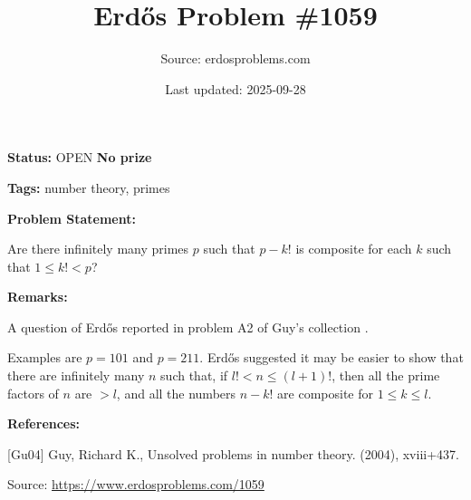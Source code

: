 \documentclass{article}
\title{Erd\H{o}s Problem \#1059}
\date{Last updated: 2025-09-28}
\author{Source: erdosproblems.com}
\begin{document}
\maketitle

\noindent\textbf{Status:} OPEN \quad \textbf{No prize}

\noindent\textbf{Tags:} number theory, primes

\medskip
\noindent\textbf{Problem Statement:}

Are there infinitely many primes $p$ such that $p-k!$ is composite for each $k$ such that $1\leq k!<p$?

\bigskip
\noindent\textbf{Remarks:}

A question of Erd\H{o}s reported in problem A2 of Guy's collection \cite{Gu04}.

Examples are $p=101$ and $p=211$. Erd\H{o}s suggested it may be easier to show that there are infinitely many $n$ such that, if $l!<n\leq (l+1)!$, then all the prime factors of $n$ are $>l$, and all the numbers $n-k!$ are composite for $1\leq k\leq l$.

\bigskip
\noindent\textbf{References:}

[Gu04] Guy, Richard K., Unsolved problems in number theory. (2004), xviii+437.

\bigskip
\noindent\small{Source: \url{https://www.erdosproblems.com/1059}}
\end{document}
